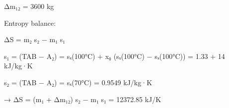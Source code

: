 Δm₁₂ = 3600 kg  

Entropy balance:  

ΔS = m₂ s₂ − m₁ s₁  

s₁ = (TAB − A₂) = sₓ(100°C) + x₀ (sₓ(100°C) − sₓ(100°C)) = 1.33 + 14 kJ/kg·K  

s₂ = (TAB − A₂) = sₓ(70°C) = 0.9549 kJ/kg·K  

→ ΔS = (m₁ + Δm₁₂) s₂ − m₁ s₁ = 12372.85 kJ/K